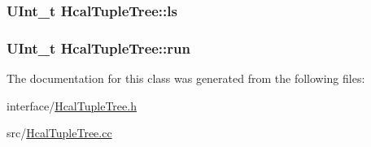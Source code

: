 \subsubsection[{ls}]{\setlength{\rightskip}{0pt plus 5cm}U\+Int\+\_\+t Hcal\+Tuple\+Tree\+::ls}\label{class_hcal_tuple_tree_a6a440ac41ccfdf350de9344c160cd2d4}
\hypertarget{class_hcal_tuple_tree_a387c336e6d042e9b98d4a7552b42daf0}{}
\subsubsection[{run}]{\setlength{\rightskip}{0pt plus 5cm}U\+Int\+\_\+t Hcal\+Tuple\+Tree\+::run}\label{class_hcal_tuple_tree_a387c336e6d042e9b98d4a7552b42daf0}


The documentation for this class was generated from the following files\+:\begin{DoxyCompactItemize}
\item 
interface/\hyperlink{_hcal_tuple_tree_8h}{Hcal\+Tuple\+Tree.\+h}\item 
src/\hyperlink{_hcal_tuple_tree_8cc}{Hcal\+Tuple\+Tree.\+cc}\end{DoxyCompactItemize}
